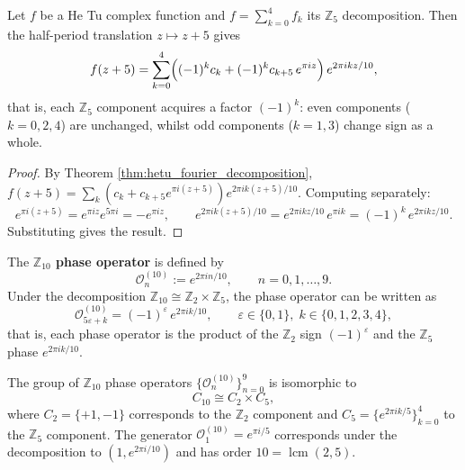 \begin{proposition}\label{prop:hetu_yin_yang_flip}
Let $f$ be a He Tu complex function and $f = \sum_{k=0}^{4} f_k$ its $\mathbb{Z}_5$ decomposition. Then the half-period translation $z \mapsto z + 5$ gives
\[
f(z + 5) = \sum_{k=0}^{4} \Bigl( (-1)^k c_k + (-1)^k c_{k+5}\, e^{\pi i z} \Bigr)\, e^{2\pi i k z / 10},
\]
that is, each $\mathbb{Z}_5$ component acquires a factor $(-1)^k$: even components ($k = 0, 2, 4$) are unchanged, whilst odd components ($k = 1, 3$) change sign as a whole.
\end{proposition}

\begin{proof}
By Theorem \ref{thm:hetu_fourier_decomposition}, $f(z+5) = \sum_k (c_k + c_{k+5} e^{\pi i (z+5)}) e^{2\pi i k (z+5)/10}$. Computing separately:
\[
e^{\pi i (z+5)} = e^{\pi i z} e^{5\pi i} = -e^{\pi i z},\qquad
e^{2\pi i k (z+5)/10} = e^{2\pi i k z / 10}\, e^{\pi i k} = (-1)^k\, e^{2\pi i k z / 10}.
\]
Substituting gives the result.
\end{proof}

\begin{definition}\label{def:hetu_phase_operator}
The \textbf{$\mathbb{Z}_{10}$ phase operator} is defined by
\[
\mathcal{O}_n^{(10)} := e^{2\pi i n / 10}, \qquad n = 0, 1, \dots, 9.
\]
Under the decomposition $\mathbb{Z}_{10} \cong \mathbb{Z}_2 \times \mathbb{Z}_5$, the phase operator can be written as
\[
\mathcal{O}_{5\varepsilon + k}^{(10)} = (-1)^\varepsilon\, e^{2\pi i k / 10}, \qquad \varepsilon \in \{0, 1\}, \; k \in \{0, 1, 2, 3, 4\},
\]
that is, each phase operator is the product of the $\mathbb{Z}_2$ sign $(-1)^\varepsilon$ and the $\mathbb{Z}_5$ phase $e^{2\pi i k / 10}$.
\end{definition}

\begin{proposition}\label{prop:hetu_phase_group}
The group of $\mathbb{Z}_{10}$ phase operators $\{\mathcal{O}_n^{(10)}\}_{n=0}^{9}$ is isomorphic to
\[
C_{10} \cong C_2 \times C_5,
\]
where $C_2 = \{+1, -1\}$ corresponds to the $\mathbb{Z}_2$ component and $C_5 = \{e^{2\pi i k/5}\}_{k=0}^{4}$ to the $\mathbb{Z}_5$ component. The generator $\mathcal{O}_1^{(10)} = e^{\pi i / 5}$ corresponds under the decomposition to $(1, e^{2\pi i / 10})$ and has order $10 = \operatorname{lcm}(2, 5)$.
\end{proposition}

